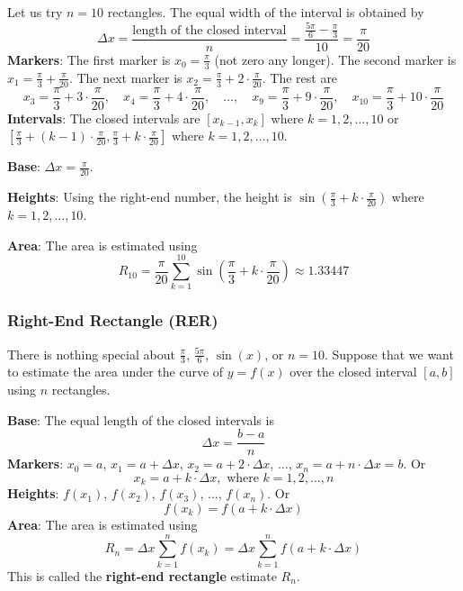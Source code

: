 \documentclass[12pt]{article}
\begin{document}
Let us try $n = 10$ rectangles. The equal width of the interval is obtained by
$$ \Delta x = \frac{\text{length of the closed interval}}{n} = \frac{\frac{5\pi}{6} - \frac{\pi}{3}}{10} = \frac{\pi}{20} $$
\textbf{Markers}: The first marker is $x_0 = \frac{\pi}{3}$ (not zero any longer). The second marker is $x_1 = \frac{\pi}{3} + \frac{\pi}{20}$. The next marker is $x_2 = \frac{\pi}{3} + 2 \cdot \frac{\pi}{20}$. The rest are
$$ x_3 = \frac{\pi}{3} + 3 \cdot \frac{\pi}{20}, \quad x_4 = \frac{\pi}{3} + 4 \cdot \frac{\pi}{20}, \quad  \ldots,  \quad x_9 = \frac{\pi}{3} + 9 \cdot \frac{\pi}{20},  \quad x_{10} = \frac{\pi}{3} + 10 \cdot \frac{\pi}{20} $$
\textbf{Intervals}: The closed intervals are $[x_{k-1}, x_k]$ where $k = 1, 2, \ldots, 10$ or\\
$[\frac{\pi}{3} + (k-1) \cdot \frac{\pi}{20}, \frac{\pi}{3} + k \cdot \frac{\pi}{20}]$ where $k = 1, 2, \dots, 10$.

\textbf{Base}: $\Delta x = \frac{\pi}{20}$.

\textbf{Heights}: Using the right-end number, the height is $\sin(\frac{\pi}{3} + k \cdot \frac{\pi}{20})$ where $k = 1, 2, \ldots, 10$. 

\textbf{Area}: The area is estimated using
$$ R_{10} = \frac{\pi}{20} \sum_{k = 1}^{10} \sin\left(\frac{\pi}{3} + k \cdot \frac{\pi}{20}\right) \approx 1.33447 $$

\subsubsection*{Right-End Rectangle (RER)}

There is nothing special about $\frac{\pi}{3}$, $\frac{5\pi}{6}$, $\sin(x)$, or $n = 10$.
Suppose that we want to estimate the area under the curve of $y = f(x)$ over the closed interval $[a, b]$ using $n$ rectangles.

\textbf{Base}: The equal length of the closed intervals is 
$$ \boxed{\quad \Delta x = \frac{b-a}{n}\quad} $$
\textbf{Markers}: $x_0 = a$, $x_1 = a + \Delta x$, $x_2 = a + 2\cdot \Delta x$, $\ldots$, $x_n = a + n \cdot \Delta x = b$. Or
$$ \boxed{\quad x_k = a + k \cdot \Delta x, \text{ where } k = 1, 2, \ldots, n \quad} $$
\textbf{Heights}: $f(x_1)$, $f(x_2)$, $f(x_3)$, $\ldots$, $f(x_n)$. Or
$$ \boxed{\quad f(x_k) = f(a + k \cdot \Delta x) \quad} $$
\textbf{Area}: The area is estimated using
$$ \boxed{\quad R_n = \Delta x \sum_{k = 1}^n f(x_k) = \Delta x \sum_{k=1}^n f(a + k \cdot \Delta x)\quad} $$
This is called the \textbf{right-end rectangle} estimate $R_n$.
\end{document}
